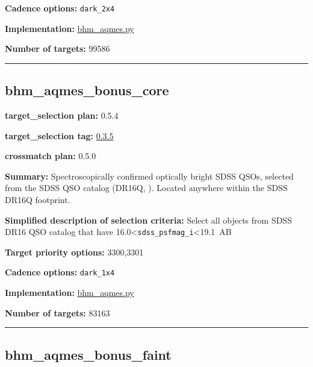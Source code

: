\noindent\textbf{Cadence options:} \texttt{dark\_2x4}

\noindent\textbf{Implementation:}
\href{https://github.com/sdss/target_selection/blob/0.3.5/python/target_selection/cartons/bhm_aqmes.py}{bhm\_aqmes.py}

\noindent\textbf{Number of targets:} 99586

\begin{center}\rule{0.5\linewidth}{0.5pt}\end{center}

\hypertarget{bhm_aqmes_bonus_core_plan0.5.4}{%
\subsection{bhm\_aqmes\_bonus\_core}\label{bhm_aqmes_bonus_core_plan0.5.4}}

\noindent\textbf{target\_selection plan:} 0.5.4

\noindent\textbf{target\_selection tag:}
\href{https://github.com/sdss/target_selection/tree/0.3.5/}{0.3.5}

\noindent\textbf{crossmatch plan:} 0.5.0

\noindent\textbf{Summary:} Spectroscopically confirmed optically bright SDSS
QSOs, selected from the SDSS QSO catalog (DR16Q,
\citealt{Lyke2020}). Located anywhere within the SDSS DR16Q footprint.

\noindent\textbf{Simplified description of selection criteria:} Select all
objects from SDSS DR16 QSO catalog that have
16.0\textless{}\texttt{sdss\_psfmag\_i}\textless19.1~AB


\noindent\textbf{Target priority options:} 3300,3301

\noindent\textbf{Cadence options:} \texttt{dark\_1x4}

\noindent\textbf{Implementation:}
\href{https://github.com/sdss/target_selection/blob/0.3.5/python/target_selection/cartons/bhm_aqmes.py}{bhm\_aqmes.py}

\noindent\textbf{Number of targets:} 83163

\begin{center}\rule{0.5\linewidth}{0.5pt}\end{center}

\hypertarget{bhm_aqmes_bonus_faint_plan0.5.4}{%
\subsection{bhm\_aqmes\_bonus\_faint}\label{bhm_aqmes_bonus_faint_plan0.5.4}}

